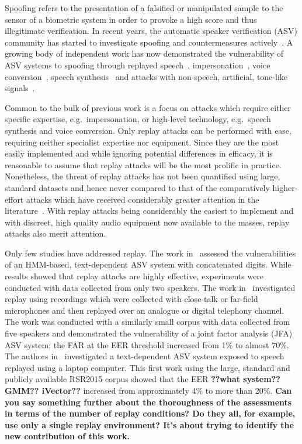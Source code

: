 
Spoofing refers to the presentation of a falsified or manipulated sample 
to the sensor of a biometric system in order to provoke a high score and 
thus illegitimate verification.
In recent years, the automatic speaker verification (ASV) community has 
started to investigate spoofing and countermeasures 
actively~\cite{interspeechSpecialSession, Wu2014a}. 
A growing 
body of independent work has now demonstrated the vulnerability of ASV 
systems to spoofing through 
replayed speech~\cite{Lindberg1999,Villalba2010},
impersonation~\cite{Blomberg2004,Farrus2008}, voice 
conversion~\cite{Perrot2005, Pellom1999}, speech 
synthesis~\cite{Masuko1999, Leon2010} and attacks with non-speech, 
artificial, tone-like signals~\cite{Alegre2012a,Alegre2012b}.

Common to the bulk of previous work is a focus on attacks 
which require either specific expertise, e.g.~impersonation, or high-level 
technology, e.g.~speech synthesis and voice conversion. 
Only replay attacks can be performed with ease, requiring neither specialist 
expertise nor equipment.  Since they are the most easily 
implemented and while ignoring potential differences in efficacy, 
it is reasonable to assume that replay attacks will be the most prolific
in practice.  Nonetheless, the threat of 
replay attacks has not been quantified using large, standard 
datasets and hence never compared to that of the comparatively higher-effort
attacks which have received considerably greater attention in the
literature~\cite{Wu2014a,handbookChapter}.
With replay attacks being considerably the easiest to implement
and with discreet, high quality audio equipment now available to the masses,
replay attacks also merit attention.

Only few studies have addressed replay.  
The work in~\cite{Lindberg1999} assessed the vulnerabilities of an HMM-based, text-dependent ASV system with concatenated digits.  
While results showed that replay attacks are highly effective, experiments were conducted with data collected from only two speakers.
The work in~\cite{Villalba2010} investigated replay using recordings which were collected with close-talk or far-field microphones and then replayed over an analogue or digital telephony channel. 
The work was conducted with a similarly small corpus with data collected from five speakers and demonstrated the vulnerability of a joint factor analysis (JFA) ASV system; the FAR at the EER threshold increased from 1\% to almost 70\%. 
The authors in~\cite{Wu2014} investigated a text-dependent 
ASV system exposed to speech replayed using a laptop computer. 
This first work using the large, standard and publicly available RSR2015 corpus showed that the EER {\bfseries ??what system?? GMM?? iVector??} increased from approximately 4\% to more than 20\%.
{\bfseries Can you say something further about the thoroughness of the assessments in terms of the number of replay conditions?  Do they all, for example, use only a single replay environment?  It's about trying to identify the new contribution of this work.}

